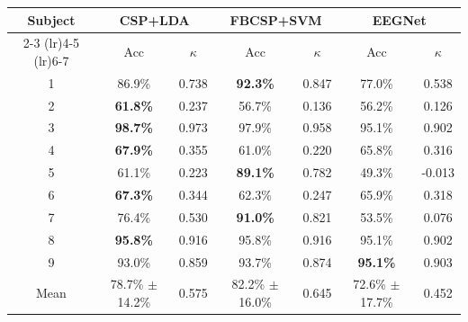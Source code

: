 \begin{tabular}{ccccccc}
\toprule
Subject & \multicolumn{2}{c}{CSP+LDA} & \multicolumn{2}{c}{FBCSP+SVM} & \multicolumn{2}{c}{EEGNet} \\
\cmidrule(lr){2-3} \cmidrule(lr){4-5} \cmidrule(lr){6-7}
 & Acc & $\kappa$ & Acc & $\kappa$ & Acc & $\kappa$ \\
\midrule
1 & 86.9\% & 0.738 & \textbf{92.3\%} & 0.847 & 77.0\% & 0.538 \\
2 & \textbf{61.8\%} & 0.237 & 56.7\% & 0.136 & 56.2\% & 0.126 \\
3 & \textbf{98.7\%} & 0.973 & 97.9\% & 0.958 & 95.1\% & 0.902 \\
4 & \textbf{67.9\%} & 0.355 & 61.0\% & 0.220 & 65.8\% & 0.316 \\
5 & 61.1\% & 0.223 & \textbf{89.1\%} & 0.782 & 49.3\% & -0.013 \\
6 & \textbf{67.3\%} & 0.344 & 62.3\% & 0.247 & 65.9\% & 0.318 \\
7 & 76.4\% & 0.530 & \textbf{91.0\%} & 0.821 & 53.5\% & 0.076 \\
8 & \textbf{95.8\%} & 0.916 & 95.8\% & 0.916 & 95.1\% & 0.902 \\
9 & 93.0\% & 0.859 & 93.7\% & 0.874 & \textbf{95.1\%} & 0.903 \\
\midrule
Mean & 78.7\% $\pm$ 14.2\% & 0.575 & 82.2\% $\pm$ 16.0\% & 0.645 & 72.6\% $\pm$ 17.7\% & 0.452 \\
\bottomrule
\end{tabular}